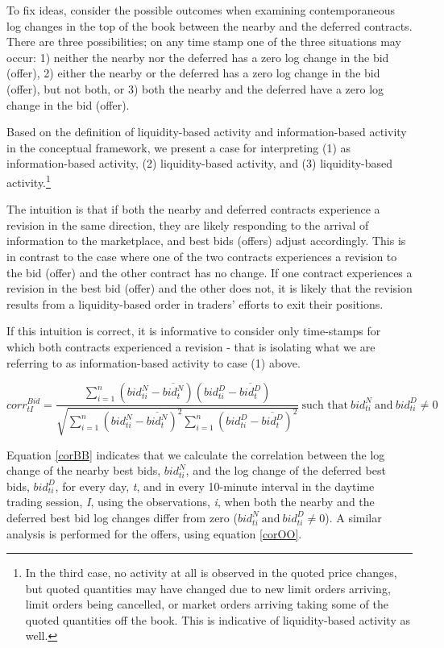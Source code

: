 \documentclass[review,12pt]{elsarticle}
\begin{document}
To fix ideas, consider the possible outcomes when examining
contemporaneous log changes in the top of the book between the nearby
and the deferred contracts. There are three possibilities; on any time
stamp one of the three situations may occur: 1) neither the nearby nor
the deferred has a zero log change in the bid (offer), 2) either the
nearby or the deferred has a zero log change in the bid (offer), but not
both, or 3) both the nearby and the deferred have a zero log change in
the bid (offer).

Based on the definition of liquidity-based activity and
information-based activity in the conceptual framework, we present a
case for interpreting (1) as information-based activity, (2)
liquidity-based activity, and (3) liquidity-based activity.\footnote{In
  the third case, no activity at all is observed in the quoted price
  changes, but quoted quantities may have changed due to new limit
  orders arriving, limit orders being cancelled, or market orders
  arriving taking some of the quoted quantities off the book. This is
  indicative of liquidity-based activity as well.}

The intuition is that if both the nearby and deferred contracts
experience a revision in the same direction, they are likely responding
to the arrival of information to the marketplace, and best bids (offers)
adjust accordingly. This is in contrast to the case where one of the two
contracts experiences a revision to the bid (offer) and the other
contract has no change. If one contract experiences a revision in the
best bid (offer) and the other does not, it is likely that the revision
results from a liquidity-based order in traders' efforts to exit their
positions.

If this intuition is correct, it is informative to consider only
time-stamps for which both contracts experienced a revision - that is
isolating what we are referring to as information-based activity to case
(1) above.

\begin{equation} \label{corBB} 
corr^{Bid}_{tI} = \frac{\sum\limits_{i=1}^{n} \left(bid_{ti}^N - \overline{bid_t^N}\right) \left(bid_{ti}^D - \overline{bid_t^D}\right)}{\sqrt{\sum\limits_{i=1}^{n} \left(bid_{ti}^N - \overline{bid_t^N}\right)^2 \sum\limits_{i=1}^{n}\left(bid_{ti}^D - \overline{bid_t^D}\right)^2}} \: \textrm{such that} \: bid_{ti}^N \: \textrm{and} \: bid_{ti}^D \neq 0
\end{equation}

Equation \ref{corBB} indicates that we calculate the correlation between
the log change of the nearby best bids, \(bid_{ti}^N\), and the log
change of the deferred best bids, \(bid_{ti}^D\), for every day,
\emph{t}, and in every 10-minute interval in the daytime trading
session, \emph{I}, using the observations, \emph{i}, when both the
nearby and the deferred best bid log changes differ from zero
(\(bid_{ti}^N \: \textrm{and} \: bid_{ti}^D \neq 0\)). A similar
analysis is performed for the offers, using equation \ref{corOO}.
\end{document}
